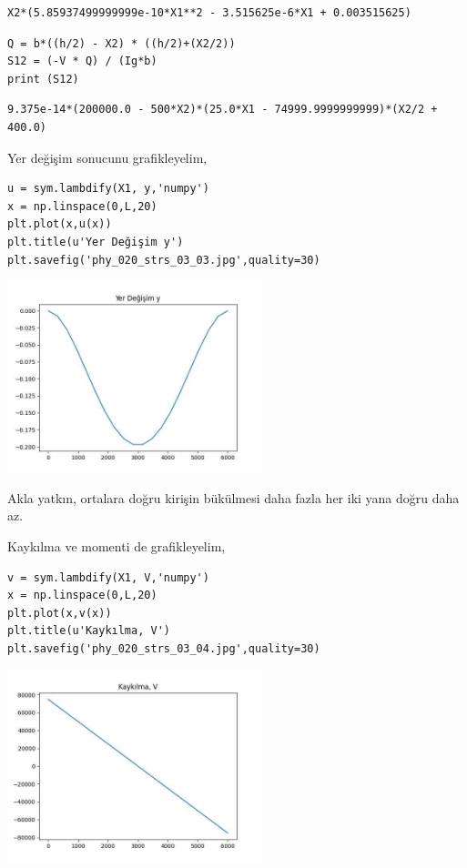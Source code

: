\documentclass[12pt,fleqn]{article}\usepackage{../../common}
\begin{document}
\begin{verbatim}
X2*(5.85937499999999e-10*X1**2 - 3.515625e-6*X1 + 0.003515625)
\end{verbatim}

\begin{verbatim}
Q = b*((h/2) - X2) * ((h/2)+(X2/2))
S12 = (-V * Q) / (Ig*b)
print (S12)
\end{verbatim}

\begin{verbatim}
9.375e-14*(200000.0 - 500*X2)*(25.0*X1 - 74999.9999999999)*(X2/2 + 400.0)
\end{verbatim}

Yer değişim sonucunu grafikleyelim,

\begin{verbatim}
u = sym.lambdify(X1, y,'numpy')
x = np.linspace(0,L,20)
plt.plot(x,u(x))
plt.title(u'Yer Değişim y')
plt.savefig('phy_020_strs_03_03.jpg',quality=30)
\end{verbatim}

\includegraphics[width=20em]{phy_020_strs_03_03.jpg}

Akla yatkın, ortalara doğru kirişin bükülmesi daha fazla her iki yana doğru daha
az.

Kaykılma ve momenti de grafikleyelim,

\begin{verbatim}
v = sym.lambdify(X1, V,'numpy')
x = np.linspace(0,L,20)
plt.plot(x,v(x))
plt.title(u'Kaykılma, V')
plt.savefig('phy_020_strs_03_04.jpg',quality=30)
\end{verbatim}

\includegraphics[width=20em]{phy_020_strs_03_04.jpg}
\end{document}
